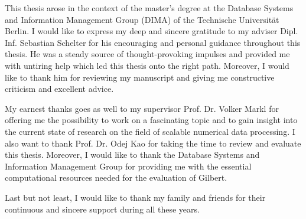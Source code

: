 \clearemptydoublepage
{}
{}	



\vspace*{2cm}

\begin{center}
\end{center}

\vspace{1cm}

This thesis arose in the context of the master’s degree at the Database Systems and Information Management Group (DIMA) of the Technische Universität Berlin. 
I would like to express my deep and sincere gratitude to my adviser Dipl. Inf. Sebastian Schelter for his encouraging and personal guidance throughout this thesis. 
He was a steady source of thought-provoking impulses and provided me with untiring help which led this thesis onto the right path. 
Moreover, I would like to thank him for reviewing my manuscript and giving me constructive criticism and excellent advice.

My earnest thanks goes as well to my supervisor Prof. Dr. Volker Markl for offering me the possibility to work on a fascinating topic and to gain insight into the current state of research on the field of scalable numerical data processing.
I also want to thank Prof. Dr. Odej Kao for taking the time to review and evaluate this thesis.
Moreover, I would like to thank the Database Systems and Information Management Group for providing me with the essential computational resources needed for the evaluation of Gilbert.

Last but not least, I would like to thank my family and friends for their continuous and sincere support during all these years.